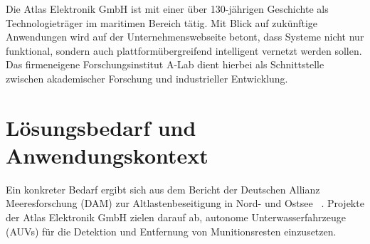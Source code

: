 Die Atlas Elektronik GmbH ist mit einer über 130-jährigen Geschichte als Technologieträger im maritimen Bereich tätig. Mit Blick auf zukünftige Anwendungen wird auf der Unternehmenswebseite betont, dass Systeme nicht nur funktional, sondern auch plattformübergreifend intelligent vernetzt werden sollen. Das firmeneigene Forschungsinstitut A-Lab dient hierbei als Schnittstelle zwischen akademischer Forschung und industrieller Entwicklung.

\section{Lösungsbedarf und Anwendungskontext}

Ein konkreter Bedarf ergibt sich aus dem Bericht der Deutschen Allianz Meeresforschung (DAM) zur Altlastenbeseitigung in Nord- und Ostsee ~\parencite{dam2024}. Projekte der Atlas Elektronik GmbH zielen darauf ab, autonome Unterwasserfahrzeuge (AUVs) für die Detektion und Entfernung von Munitionsresten einzusetzen. 